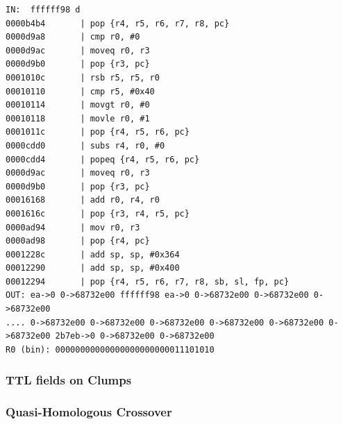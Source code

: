 \documentclass[11pt]{article}
\begin{document}
\begin{verbatim}
IN:  ffffff98 d
0000b4b4       | pop {r4, r5, r6, r7, r8, pc}
0000d9a8       | cmp r0, #0
0000d9ac       | moveq r0, r3
0000d9b0       | pop {r3, pc}
0001010c       | rsb r5, r5, r0
00010110       | cmp r5, #0x40
00010114       | movgt r0, #0
00010118       | movle r0, #1
0001011c       | pop {r4, r5, r6, pc}
0000cdd0       | subs r4, r0, #0
0000cdd4       | popeq {r4, r5, r6, pc}
0000d9ac       | moveq r0, r3
0000d9b0       | pop {r3, pc}
00016168       | add r0, r4, r0
0001616c       | pop {r3, r4, r5, pc}
0000ad94       | mov r0, r3
0000ad98       | pop {r4, pc}
0001228c       | add sp, sp, #0x364
00012290       | add sp, sp, #0x400
00012294       | pop {r4, r5, r6, r7, r8, sb, sl, fp, pc}
OUT: ea->0 0->68732e00 ffffff98 ea->0 0->68732e00 0->68732e00 0->68732e00 
.... 0->68732e00 0->68732e00 0->68732e00 0->68732e00 0->68732e00 0->68732e00 2b7eb->0 0->68732e00 0->68732e00 
R0 (bin): 00000000000000000000000011101010
\end{verbatim}

\subsubsection*{TTL fields on Clumps}
\label{sec:orgb3118ac}

\subsubsection*{Quasi-Homologous Crossover}
\label{sec:orgbf88092}

\subsection*{}
\label{sec:org71c6635}
\end{document}
